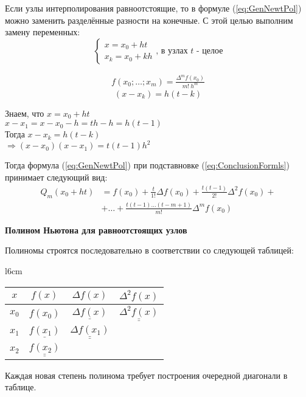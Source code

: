 \documentclass[a4paper,11pt]{article}
\begin{document}
Если узлы интерполирования равноотстоящие, то в формуле (\ref{eq:GenNewtPol}) можно заменить разделённые разности на конечные. С этой целью выполним замену переменных:
\begin{equation*}
  \begin{cases}
    x = x_0 + ht \\
    x_k = x_0 + kh
  \end{cases}, \, \text{в узлах $t$ - целое}
\end{equation*}

\begin{gather}
  f(x_0; \dots; x_m) = \frac{\Delta^mf(x_0)}{m!\ h^m}
  \label{eq:ConclusionFormls}
\end{gather}
\begin{equation*}
  (x - x_k) = h(t - k)
\end{equation*}

\begin{flushright}
  \footnotesize {
    Знаем, что $x = x_0 + ht$ \\
    $x-x_1 = x-x_0-h = th-h = h(t-1)$ \\
    Тогда $x-x_k = h(t-k)$ \\
    $\Rightarrow (x-x_0)(x-x_1) = t(t-1)h^2$ }
\end{flushright}

Тогда формула (\ref{eq:GenNewtPol}) при подставновке (\ref{eq:ConclusionFormls}) принимает следующий вид:
\begin{align*}
  Q_m(x_0 + ht) & = f(x_0) + \frac{t}{1!}\Delta f(x_0) + \frac{t(t-1)}{2!}\Delta^2f(x_0) + \\
                & + \dots + \frac{t(t-1)\dots(t-m+1)}{m!}\Delta^mf(x_0)
\end{align*}
  \begin{center}
  \textbf{Полином Ньютона для равноотстоящих узлов}
\end{center}

\vspace{5mm}
Полиномы строятся последовательно в соответствии со следующей таблицей:

\begin{minipage}{\linewidth}
  \begin{wraptable}{l}{6cm}
    \begin{tabular}{ c|c|c|c }
      $x$ & $f(x)$ & $\Delta f(x)$ & $\Delta^2f(x)$ \\
      \hline
      $x_0$ & $f(x_0)$ & $\underline{\Delta f(x)}$ & $\underline{\underline{\Delta^2f(x)}}$ \\
      $x_1$ & $\underline{f(x_1)}$ & $\underline{\underline{\Delta f(x_1)}}$ & \\
      $x_2$ & $\underline{\underline{f(x_2)}}$ & &
    \end{tabular}
  \end{wraptable}
    Каждая новая степень полинома требует построения очередной диагонали в таблице.
\end{minipage}
\end{document}
